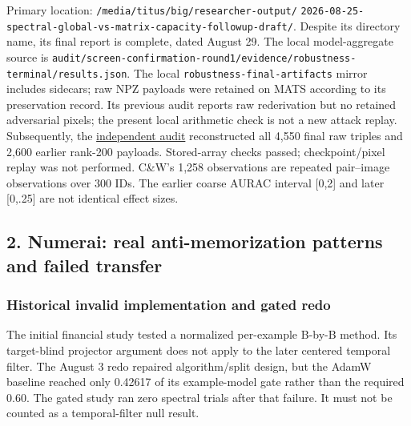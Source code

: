 \documentclass[
  british,
  10pt,
  a4paper,
]{article}
\begin{document}
Primary location:
\texttt{/\allowbreak{}media/\allowbreak{}titus/\allowbreak{}big/\allowbreak{}researcher-\allowbreak{}output/\allowbreak{}}
\texttt{2026-\allowbreak{}08-\allowbreak{}25-\allowbreak{}spectral-\allowbreak{}global-\allowbreak{}vs-\allowbreak{}matrix-\allowbreak{}capacity-\allowbreak{}followup-\allowbreak{}draft/\allowbreak{}}.
Despite its directory name, its final report is complete, dated August
29. The local model-\allowbreak{}aggregate source is
\texttt{audit/\allowbreak{}screen-\allowbreak{}confirmation\allowbreak{}-\allowbreak{}round1/\allowbreak{}evidence/\allowbreak{}robustness-\allowbreak{}terminal/\allowbreak{}results.\allowbreak{}json}.
The local \texttt{robustness-\allowbreak{}final-\allowbreak{}artifacts}
mirror includes sidecars; raw NPZ payloads were retained on MATS
according to its preservation record. Its previous audit reports raw
rederivation but no retained adversarial pixels; the present local
arithmetic check is not a new attack replay.
Subsequently\allowbreak{},\allowbreak{} the
\hyperref[external-results-audit]{independent audit} reconstructed all
4,550 final raw triples and 2,600 earlier rank-200 payloads.
Stored-\allowbreak{}array checks passed; checkpoint/\allowbreak{}pixel
replay was not performed. C\&W's 1,258 observations are repeated
pair--image observations over 300 IDs. The earlier coarse AURAC interval
{[}0,2{]} and later {[}0,.25{]} are not identical effect sizes.

\subsection{\texorpdfstring{2. Numerai: real
anti-\allowbreak{}memorization\allowbreak{} patterns and failed
transfer}{2. Numerai: real  patterns and failed transfer}}\label{external-studies--numerai-real-anti-memorization-patterns-and-failed-transfer}

\subsubsection{Historical invalid implementation and gated
redo}\label{external-studies--historical-invalid-implementation-and-gated-redo}

The initial financial study tested a normalized per-\allowbreak{}example
B-by-B method. Its target-\allowbreak{}blind projector argument does not
apply to the later centered temporal filter. The August 3 redo repaired
algorithm/\allowbreak{}split design, but the AdamW baseline reached only
0.42617 of its example-\allowbreak{}model gate rather than the required
0.60. The gated study ran zero spectral trials after that failure. It
must not be counted as a temporal-\allowbreak{}filter null result.
\end{document}
